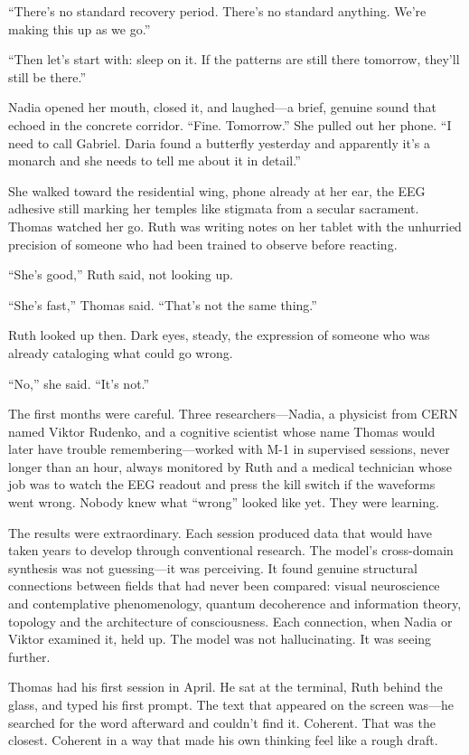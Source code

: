 ``There's no standard recovery period. There's no standard anything. We're making this up as we go.''

``Then let's start with: sleep on it. If the patterns are still there tomorrow, they'll still be there.''

Nadia opened her mouth, closed it, and laughed---a brief, genuine sound that echoed in the concrete corridor. ``Fine. Tomorrow.'' She pulled out her phone. ``I need to call Gabriel. Daria found a butterfly yesterday and apparently it's a monarch and she needs to tell me about it in detail.''

She walked toward the residential wing, phone already at her ear, the EEG adhesive still marking her temples like stigmata from a secular sacrament. Thomas watched her go. Ruth was writing notes on her tablet with the unhurried precision of someone who had been trained to observe before reacting.

``She's good,'' Ruth said, not looking up.

``She's fast,'' Thomas said. ``That's not the same thing.''

Ruth looked up then. Dark eyes, steady, the expression of someone who was already cataloging what could go wrong.

``No,'' she said. ``It's not.''

\scenebreak

The first months were careful. Three researchers---Nadia, a physicist from CERN named Viktor Rudenko, and a cognitive scientist whose name Thomas would later have trouble remembering---worked with M-1 in supervised sessions, never longer than an hour, always monitored by Ruth and a medical technician whose job was to watch the EEG readout and press the kill switch if the waveforms went wrong. Nobody knew what ``wrong'' looked like yet. They were learning.

The results were extraordinary. Each session produced data that would have taken years to develop through conventional research. The model's cross-domain synthesis was not guessing---it was perceiving. It found genuine structural connections between fields that had never been compared: visual neuroscience and contemplative phenomenology, quantum decoherence and information theory, topology and the architecture of consciousness. Each connection, when Nadia or Viktor examined it, held up. The model was not hallucinating. It was seeing further.

Thomas had his first session in April. He sat at the terminal, Ruth behind the glass, and typed his first prompt. The text that appeared on the screen was---he searched for the word afterward and couldn't find it. Coherent. That was the closest. Coherent in a way that made his own thinking feel like a rough draft.

